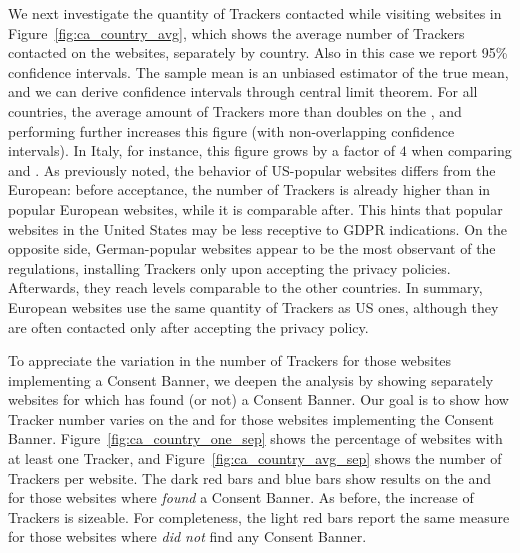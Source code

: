 We next investigate the quantity of Trackers contacted while visiting websites in Figure~\ref{fig:ca_country_avg}, which shows the average number of Trackers contacted on the websites, separately by country. Also in this case we report 95\% confidence intervals. The sample mean is an unbiased estimator of the true mean, and we can derive confidence intervals through central limit theorem. For all countries, the average amount of Trackers more than doubles on the \AFTER, and performing \INTERNAL further increases this figure (with non-overlapping confidence intervals). In Italy, for instance, this figure grows by a factor of $4$ when comparing \BEFORE and \INTERNAL. As previously noted, the behavior of US-popular websites differs from the European: before acceptance, the number of Trackers is already higher than in popular European websites, while it is comparable after. This hints that popular websites in the United States may be less receptive to GDPR indications. On the opposite side, German-popular websites appear to be the most observant of the regulations, installing Trackers only upon accepting the privacy policies. Afterwards, they reach levels comparable to the other countries. In summary, European websites use the same quantity of Trackers as US ones, although they are often contacted only after accepting the privacy policy. %


To appreciate the variation in the number of Trackers for those websites implementing a Consent Banner, we deepen the analysis by showing separately websites for which \TOOL has found (or not) a Consent Banner. Our goal is to show how Tracker number varies on the \BEFORE and \AFTER for those websites implementing the Consent Banner. Figure~\ref{fig:ca_country_one_sep} shows the percentage of websites with at least one Tracker, and Figure~\ref{fig:ca_country_avg_sep} shows the number of Trackers per website. The dark red bars and blue bars show results on the \BEFORE and \AFTER for those websites where \TOOL \emph{found} a Consent Banner.  As before, the increase of Trackers is sizeable. For completeness, the light red bars report the same measure for those websites where \TOOL \emph{did not} find any Consent Banner.

